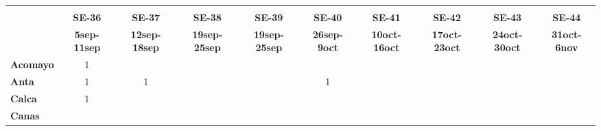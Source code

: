 \begin{tabular}{lccccccccc}
	\textbf{}              & \multicolumn{1}{l}{}                        & \multicolumn{1}{l}{}      & \multicolumn{1}{l}{}                         & \multicolumn{1}{l}{}                         & \multicolumn{1}{l}{}                         & \multicolumn{1}{l}{}                        & \multicolumn{1}{l}{}                         & \multicolumn{1}{l}{}                         & \multicolumn{1}{l}{}     \\
	\textbf{}                                    & \textbf{SE-36}                   & \textbf{SE-37}                               & \textbf{SE-38}                               & \textbf{SE-39}                               & \textbf{SE-40}                               & \textbf{SE-41}                               & \textbf{SE-42}                               & \textbf{SE-43}                   & \textbf{SE-44}   \\
	\textbf{}           & \textbf{5sep-11sep}       & \textbf{12sep-18sep} & \textbf{19sep-25sep} & \textbf{19sep-25sep} & \textbf{26sep-9oct} & \textbf{10oct-16oct} & \textbf{17oct-23oct} & \textbf{24oct-30oct}  & \textbf{31oct-6nov}    \\
	\textbf{Acomayo}                             & 1                                & \cellcolor[HTML]{FCC46C}                     & \cellcolor[HTML]{FCC46C}                   & \cellcolor[HTML]{FCC46C}         & \cellcolor[HTML]{FCC46C}                    & \cellcolor[HTML]{FCC46C}                   & \cellcolor[HTML]{FCC46C}         & \cellcolor[HTML]{FCC46C} 
	& \cellcolor[HTML]{FCC46C} \\
	\textbf{Anta}                                & 1                                & 1                                           & \cellcolor[HTML]{FCC46C}                   & \cellcolor[HTML]{FCC46C}         & 1                   						& \cellcolor[HTML]{FCC46C}                   & \cellcolor[HTML]{FCC46C}         & \cellcolor[HTML]{FCC46C} 					  & \cellcolor[HTML]{FCC46C} \\
	\textbf{Calca}      & 1					     & \cellcolor[HTML]{FCC46C}         & \cellcolor[HTML]{FCC46C}                     & \cellcolor[HTML]{FCC46C}                   & \cellcolor[HTML]{FCC46C}         & \cellcolor[HTML]{FCC46C}                     & \cellcolor[HTML]{FCC46C}                   & \cellcolor[HTML]{FCC46C}  		& \cellcolor[HTML]{FCC46C}\\
	\textbf{Canas}      &\cellcolor[HTML]{FCC46C}                                   & \cellcolor[HTML]{FCC46C}  

\end{tabular}
